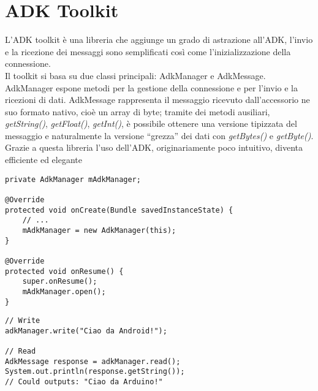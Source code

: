 \section {ADK Toolkit}
L'ADK toolkit è una libreria che aggiunge un grado di astrazione all'ADK, l'invio
 e la ricezione dei messaggi sono semplificati così come l'inizializzazione della 
 connessione.\\
Il toolkit si basa su due classi principali: AdkManager e AdkMessage.	\\	
AdkManager espone metodi per la gestione della connessione e per l'invio e la 
ricezioni di dati. AdkMessage rappresenta il messaggio ricevuto dall'accessorio 
ne suo formato nativo, cioè un array di byte; tramite dei metodi ausiliari, 
\textit{getString()}, \textit{getFloat()}, \textit{getInt()}, è possibile 
ottenere una versione tipizzata del messaggio e naturalmente la versione ``grezza'' 
dei dati con \textit{getBytes()} e \textit{getByte()}.\\
Grazie a questa libreria l'uso dell'ADK, originariamente poco intuitivo, diventa 
efficiente ed elegante
\begin{lstlisting}[caption=Inizializzazione della connessione con l'accessorio]
private AdkManager mAdkManager;

@Override
protected void onCreate(Bundle savedInstanceState) {
    // ...
    mAdkManager = new AdkManager(this);
}

@Override
protected void onResume() {
    super.onResume();
    mAdkManager.open();
}
\end{lstlisting}
\begin{lstlisting}[caption=Lettura e scrittura dati]
// Write
adkManager.write("Ciao da Android!");

// Read
AdkMessage response = adkManager.read();
System.out.println(response.getString());
// Could outputs: "Ciao da Arduino!"
\end{lstlisting}
